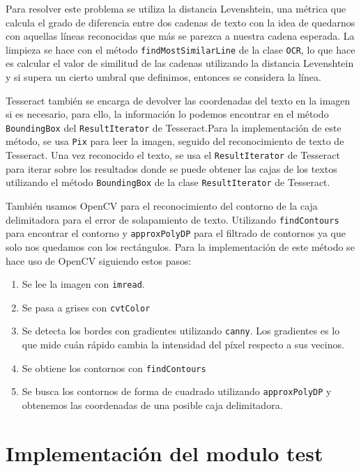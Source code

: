 Para resolver este problema se utiliza la distancia Levenshtein, una métrica que calcula el grado de diferencia entre dos cadenas de texto con la idea de quedarnos con aquellas líneas reconocidas que más se parezca a nuestra cadena esperada. 
La limpieza se hace con el método \texttt{findMostSimilarLine} de la clase \texttt{OCR}, lo que hace es calcular el valor de similitud de las cadenas utilizando la distancia Levenshtein y si supera un cierto umbral que definimos, entonces se considera la línea.


Tesseract también se encarga de devolver las coordenadas del texto en la imagen si es necesario, para ello, la información lo podemos encontrar en el método \texttt{BoundingBox} del \texttt{ResultIterator} de Tesseract.Para la implementación de este método, se usa \texttt{Pix} para leer la imagen, seguido del reconocimiento de texto de Tesseract. Una vez reconocido el texto, se usa el \texttt{ResultIterator} de Tesseract para iterar sobre los resultados donde se puede obtener las cajas de los textos utilizando el método \texttt{BoundingBox} de la clase \texttt{ResultIterator} de Tesseract.

También usamos OpenCV para el reconocimiento del contorno de la caja delimitadora para el error de solapamiento de texto. Utilizando \texttt{findContours} para encontrar el contorno y \texttt{approxPolyDP} para el filtrado de contornos ya que solo nos quedamos con los rectángulos. Para la implementación de este método se hace uso de OpenCV siguiendo estos pasos:
\begin{enumerate}
	\item Se lee la imagen con \texttt{imread}.
	\item Se pasa a grises con \texttt{cvtColor}
	\item Se detecta los bordes con gradientes utilizando \texttt{canny}. Los gradientes es lo que mide cuán rápido cambia la intensidad del píxel respecto a sus vecinos.
	\item Se obtiene los contornos con \texttt{findContours}
	\item Se busca los contornos de forma de cuadrado utilizando \texttt{approxPolyDP} y obtenemos las coordenadas de una posible caja delimitadora.
\end{enumerate}

\section{Implementación del modulo test}
\label{sec:Implementación de los tests}


